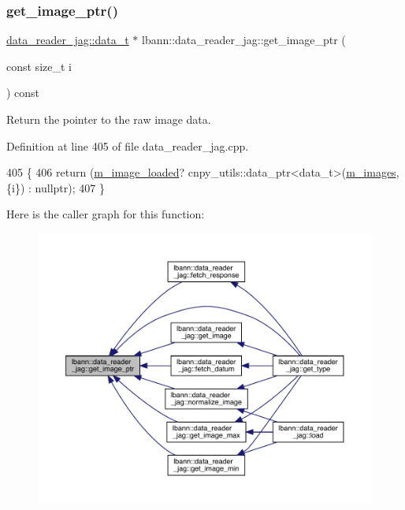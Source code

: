 \subsubsection{\texorpdfstring{get\+\_\+image\+\_\+ptr()}{get\_image\_ptr()}}
{\footnotesize\ttfamily \hyperlink{classlbann_1_1data__reader__jag_a7377d6c02c455f019a378489b9b8eab4}{data\+\_\+reader\+\_\+jag\+::data\+\_\+t} $\ast$ lbann\+::data\+\_\+reader\+\_\+jag\+::get\+\_\+image\+\_\+ptr (\begin{DoxyParamCaption}\item[{const size\+\_\+t}]{i }\end{DoxyParamCaption}) const}



Return the pointer to the raw image data. 



Definition at line 405 of file data\+\_\+reader\+\_\+jag.\+cpp.


\begin{DoxyCode}
405                                                                           \{
406   \textcolor{keywordflow}{return} (\hyperlink{classlbann_1_1data__reader__jag_a3f1691818996f73dc918dfd0e8f98a70}{m\_image\_loaded}? cnpy\_utils::data\_ptr<data\_t>(\hyperlink{classlbann_1_1data__reader__jag_ae96696fb14653ef1b57936943eb6a800}{m\_images}, \{i\}) : \textcolor{keyword}{nullptr});
407 \}
\end{DoxyCode}
Here is the caller graph for this function\+:\nopagebreak
\begin{figure}[H]
\begin{center}
\leavevmode
\includegraphics[width=350pt]{classlbann_1_1data__reader__jag_aab51581a1b8175bf5da1b74454ef7701_icgraph}
\end{center}
\end{figure}
\mbox{\label{classlbann_1_1data__reader__jag_aef236213fa1b229a2554c494fabb8873}} 
